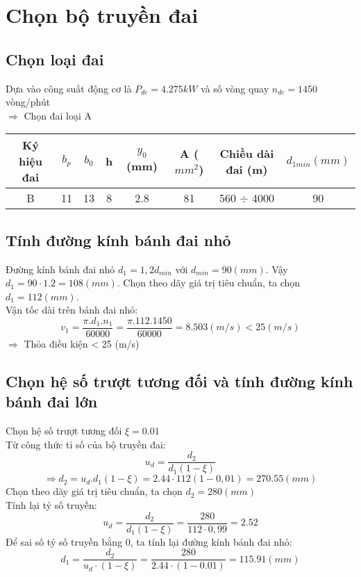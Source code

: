 \chapter{Chọn bộ truyền đai}
\section{Chọn loại đai}
Dựa vào công suất động cơ là $P_{dc} = 4.275 kW$ và số vòng quay $n_{dc} = 1450$ vòng/phút \\
$\Rightarrow$ Chọn đai loại A \\    

\begin{tabular}{|c|c|c|c|c|c|c|c|}
    \hline 
    Ký hiệu đai & $b_p$  & $b_0$  & h  & $y_0$ (mm) & A ($mm^2$) & Chiều dài đai (m) & $d_{1min} (mm)$ \\ \hline
    B & 11 & 13 & 8 & 2.8 & 81 & 560 $\div$ 4000 & 90 \\ \hline
\end{tabular}
\section{Tính đường kính bánh đai nhỏ}
Đường kính bánh đai nhỏ $d_1 = 1,2d_{min}$ với $d_{min} = 90 (mm)$. Vậy $d_1 = 90 \cdot 1.2=108(mm)$.
Chọn theo dãy giá trị tiêu chuẩn, ta chọn $d_1 = 112 (mm)$.\\
Vận tốc dài trên bánh đai nhỏ:\\
\[
    v_1 = \frac{\pi.d_1.n_1}{60000} = \frac{\pi.112.1450}{60000} = 8.503 (m/s) < 25 (m/s)
\]  
$\Rightarrow$ Thỏa điều kiện < 25 (m/s) \\
\section{Chọn hệ số trượt tương đối và tính đường kính bánh đai lớn}
Chọn hệ số trượt tương đối $\xi = 0.01$ \\
Từ công thức tỉ số của bộ truyền đai: \\
\[
    u_d = \frac{d_2}{d_1(1 - \xi)}
\]
\[
    \Rightarrow d_2 = u_d.d_1(1 - \xi) = 2.44 \cdot 112(1 - 0,01) = 270.55 (mm)
\]
Chọn theo dãy giá trị tiêu chuẩn, ta chọn $d_2 = 280 (mm)$ \\
Tính lại tỷ số truyền: \\
\[
    u_d = \frac{d_2}{d_1(1 - \xi)} = \frac{280}{112 \cdot 0,99} = 2.52
\]
Để sai số tỷ số truyền bằng 0, ta tính lại đường kính bánh đai nhỏ: \\
\[
    d_1 = \frac{d_2}{u_d \cdot (1- \xi)} = \frac{280}{2.44 \cdot (1-0.01)} = 115.91 (mm)
\]
